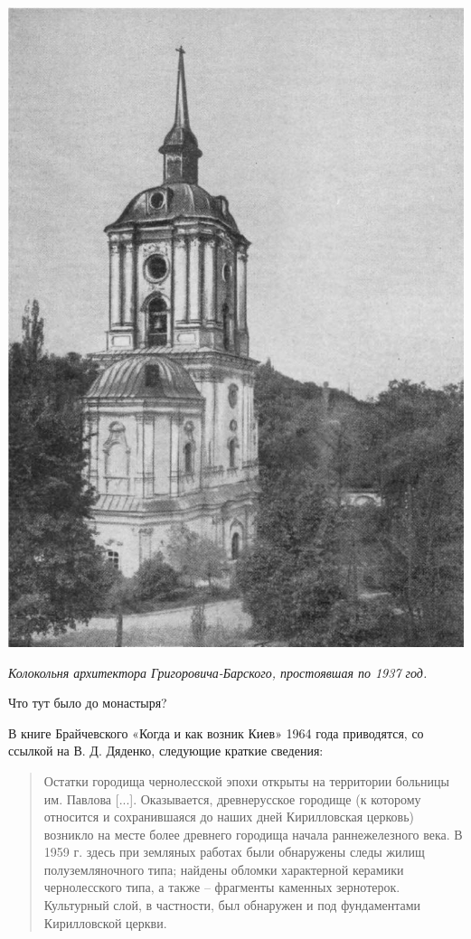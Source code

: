 \newpage
\vspace*{\fill}
\begin{center}
\includegraphics[width=\linewidth]{chast-zmiy/kurilo/kyr-kolo.jpg}

\textit{Колокольня архитектора Григоровича-Барского, простоявшая по 1937 год.}
\end{center}
\vspace*{\fill}
\newpage

Что тут было до монастыря? 

В книге Брайчевского «Когда и как возник Киев» 1964 года приводятся, со ссылкой на В. Д. Дяденко, следующие краткие сведения:

\begin{quotation}
Остатки городища чернолесской эпохи открыты на территории больницы им. Павлова [...]. Оказывается, древнерусское городище (к которому относится и сохранившаяся до наших дней Кирилловская церковь) возникло на месте более древнего городища начала раннежелезного века. В 1959 г. здесь при земляных работах были обнаружены следы жилищ полуземляночного типа; найдены обломки характерной керамики чернолесского типа, а также – фрагменты каменных зернотерок. Культурный слой, в частности, был обнаружен и под фундаментами Кирилловской церкви.
\end{quotation}

